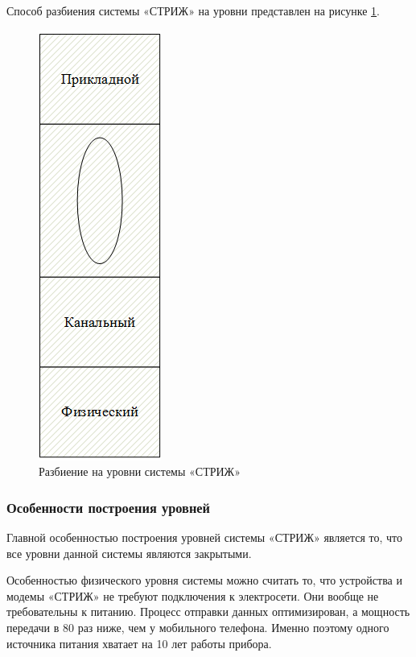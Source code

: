 Способ разбиения системы «СТРИЖ» на уровни представлен на рисунке
\ref{fig:system_levels_1}.
\begin{figure}[h]
	\centering\includegraphics[width=0.2\linewidth]{img/system_levels_1}
	\caption{Разбиение на уровни системы «СТРИЖ»}
	\label{fig:system_levels_1}
\end{figure}

\subsubsection{Особенности построения уровней}
Главной особенностью построения уровней системы «СТРИЖ» является то, что все уровни данной системы являются закрытыми.
 
Особенностью физического уровня системы можно считать то, что устройства и модемы «СТРИЖ» не требуют подключения к электросети. Они вообще не требовательны к питанию. Процесс отправки данных оптимизирован, а мощность передачи в 80 раз ниже, чем у мобильного телефона. Именно поэтому одного источника питания хватает на 10 лет работы прибора.